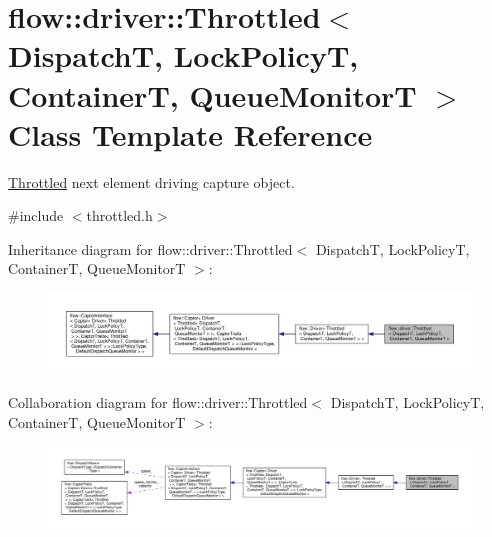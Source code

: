 \hypertarget{classflow_1_1driver_1_1_throttled}{}\section{flow\+:\+:driver\+:\+:Throttled$<$ DispatchT, Lock\+PolicyT, ContainerT, Queue\+MonitorT $>$ Class Template Reference}
\label{classflow_1_1driver_1_1_throttled}


\hyperlink{classflow_1_1driver_1_1_throttled}{Throttled} next element driving capture object.  




{\ttfamily \#include $<$throttled.\+h$>$}



Inheritance diagram for flow\+:\+:driver\+:\+:Throttled$<$ DispatchT, Lock\+PolicyT, ContainerT, Queue\+MonitorT $>$\+:
\nopagebreak
\begin{figure}[H]
\begin{center}
\leavevmode
\includegraphics[width=350pt]{classflow_1_1driver_1_1_throttled__inherit__graph}
\end{center}
\end{figure}


Collaboration diagram for flow\+:\+:driver\+:\+:Throttled$<$ DispatchT, Lock\+PolicyT, ContainerT, Queue\+MonitorT $>$\+:
\nopagebreak
\begin{figure}[H]
\begin{center}
\leavevmode
\includegraphics[width=350pt]{classflow_1_1driver_1_1_throttled__coll__graph}
\end{center}
\end{figure}
